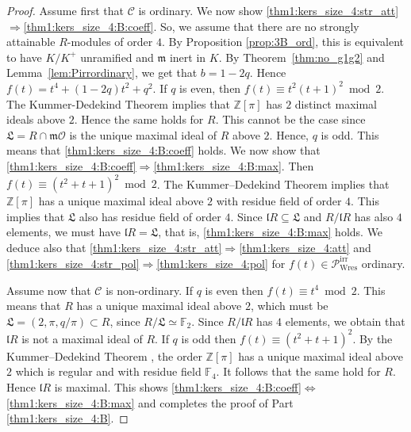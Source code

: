 \documentclass[11pt]{amsart}
\newcommand\F{\mathbb{F}}
\newcommand\Z{\mathbb{Z}}
\newcommand\cC{\mathcal{C}}
\newcommand\cO{\mathcal{O}}
\newcommand\frl{\mathfrak{l}}
\newcommand\frm{\mathfrak{m}}
\newcommand\frL{\mathfrak{L}}
\theoremstyle{plain}
\theoremstyle{definition}
\newcommand\PirrB{\mathcal{P}^\mathrm{irr}_\mathrm{Wres}}
\begin{document}
\begin{proof}
    Assume first that $\cC$ is ordinary.
    We now show \ref{thm1:kers_size_4:str_att}$\Rightarrow$\ref{thm1:kers_size_4:B:coeff}.
    So, we assume that there are no strongly attainable $R$-modules of order $4$.
    By Proposition \ref{prop:3B_ord}, this is equivalent to have $K/K^+$ unramified and $\frm$ inert in $K$.
    By Theorem~\ref{thm:no_g1g2} and Lemma~\ref{lem:Pirrordinary}, we get that $b=1-2q$.
    Hence $f(t) = t^4 +(1-2q)t^2 +q^2$.
    If $q$ is even, then $f(t)\equiv t^2(t+1)^2 \bmod 2$.
    The Kummer-Dedekind Theorem \cite[Thm.~8.2]{Stevenhagen08} implies that $\Z[\pi]$ has $2$ distinct maximal ideals above $2$.
    Hence the same holds for $R$.
    This cannot be the case since $\frL = R \cap \frm\cO$ is the unique maximal ideal of $R$ above $2$.
    Hence, $q$ is odd.
    This means that \ref{thm1:kers_size_4:B:coeff} holds.
    We now show that \ref{thm1:kers_size_4:B:coeff}$\Rightarrow$\ref{thm1:kers_size_4:B:max}.
    Then $f(t) \equiv (t^2+t+1)^2 \bmod 2$.
    The Kummer--Dedekind Theorem \cite[Thm.~8.2]{Stevenhagen08} implies that $\Z[\pi]$ has a unique maximal ideal above $2$ with residue field of order $4$.
    This implies that $\frL$ also has residue field of order $4$.
    Since $\frl R\subseteq \frL$ and $R/\frl R$ has also $4$ elements, we must have $\frl R =\frL$, that is, \ref{thm1:kers_size_4:B:max} holds.
    We deduce also that \ref{thm1:kers_size_4:str_att}$\Rightarrow$\ref{thm1:kers_size_4:att} and \ref{thm1:kers_size_4:str_pol}$\Rightarrow$\ref{thm1:kers_size_4:pol} for $f(t)\in\PirrB$ ordinary.

    Assume now that $\cC$ is non-ordinary.
    If $q$ is even then $f(t)\equiv t^4 \bmod 2$.
    This means that $R$ has a unique maximal ideal above $2$, which must be $\frL = (2,\pi,q/\pi) \subset R$, since $R/\frL \simeq \F_2$.
    Since $R/\frl R$ has $4$ elements, we obtain that $\frl R$ is not a maximal ideal of $R$.
    If $q$ is odd then $f(t)\equiv (t^2+t+1)^2$.
    By the Kummer--Dedekind Theorem \cite[Thm.~8.2]{Stevenhagen08}, the order $\Z[\pi]$ has a unique maximal ideal above $2$ which is regular and with residue field $\F_4$.
    It follows that the same hold for $R$.
    Hence $\frl R$ is maximal.
    This shows \ref{thm1:kers_size_4:B:coeff}$\iff$\ref{thm1:kers_size_4:B:max} and completes the proof of Part \ref{thm1:kers_size_4:B}.
\end{proof}
\end{document}
